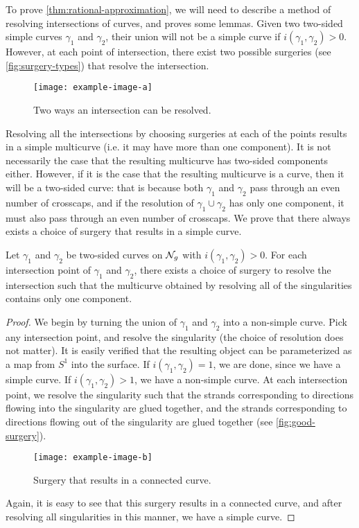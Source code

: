 \documentclass[12pt, reqno]{amsart}
\begin{document}
To prove \autoref{thm:rational-approximation}, we will need to describe a method of resolving intersections of curves, and proves some lemmas.
Given two two-sided simple curves $\gamma_1$ and $\gamma_2$, their union will not be a simple curve if $i(\gamma_1, \gamma_2) > 0$.
However, at each point of intersection, there exist two possible surgeries (see \autoref{fig:surgery-types}) that resolve the intersection.
\begin{figure}[h]
  \centering
  \texttt{[image: example-image-a]}
  \caption{Two ways an intersection can be resolved.}
  \label{fig:surgery-types}
\end{figure}
Resolving all the intersections by choosing surgeries at each of the points results in a simple multicurve (i.e. it may have more than one component).
It is not necessarily the case that the resulting multicurve has two-sided components either.
However, if it is the case that the resulting multicurve is a curve, then it will be a two-sided curve: that is because both $\gamma_1$ and $\gamma_2$ pass through an even number of crosscaps, and if the resolution of $\gamma_1 \cup \gamma_2$ has only one component, it must also pass through an even number of crosscaps.
We prove that there always exists a choice of surgery that results in a simple curve.
\begin{lemma}
  \label{lem:valid-surgery}
  Let $\gamma_1$ and $\gamma_2$ be two-sided curves on $\mathcal{N}_g$ with $i(\gamma_1, \gamma_2) > 0$.
  For each intersection point of $\gamma_1$ and $\gamma_2$, there exists a choice of surgery to resolve the intersection such that the multicurve obtained by resolving all of the singularities contains only one component.
\end{lemma}
\begin{proof}
  We begin by turning the union of $\gamma_1$ and $\gamma_2$ into a non-simple curve.
  Pick any intersection point, and resolve the singularity (the choice of resolution does not matter).
  It is easily verified that the resulting object can be parameterized as a map from $S^1$ into the surface.
  If $i(\gamma_1, \gamma_2) = 1$, we are done, since we have a simple curve.
  If $i(\gamma_1, \gamma_2) > 1$, we have a non-simple curve.
  At each intersection point, we resolve the singularity such that the strands corresponding to directions flowing into the singularity are glued together, and the strands corresponding to directions flowing out of the singularity are glued together (see \autoref{fig:good-surgery}).
  \begin{figure}[h]
    \centering
    \texttt{[image: example-image-b]}
    \caption{Surgery that results in a connected curve.}
    \label{fig:good-surgery}
  \end{figure}
Again, it is easy to see that this surgery results in a connected curve, and after resolving all singularities in this manner, we have a simple curve.
\end{proof}
\end{document}
